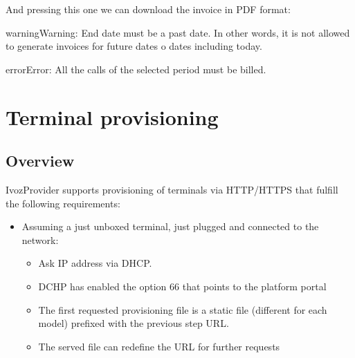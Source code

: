 \documentclass[letterpaper,10pt,english]{sphinxmanual}
\begin{document}

And pressing this one we can download the invoice in PDF format:


\begin{notice}{warning}{Warning:}
End date must be a past date. In other words, it is not allowed to
generate invoices for future dates o dates including today.
\end{notice}

\begin{notice}{error}{Error:}
All the calls of the selected period must be billed.
\end{notice}


\chapter{Terminal provisioning}
\label{provisioning/index:terminal-provisioning}\label{provisioning/index::doc}\label{provisioning/index:provisioning}

\section{Overview}
\label{provisioning/index:overview}
IvozProvider supports provisioning of terminals via HTTP/HTTPS that fulfill the
following requirements:
\begin{itemize}
\item {} 
Assuming a just unboxed terminal, just plugged and connected to the network:
\begin{itemize}
\item {} 
Ask IP address via DHCP.

\item {} 
DCHP has enabled the option 66 that points to the platform portal

\item {} 
The first requested provisioning file is a static file (different for each
model) prefixed with the previous step URL.

\item {} 
The served file can redefine the URL for further requests

\end{itemize}

\end{itemize}
\end{document}
